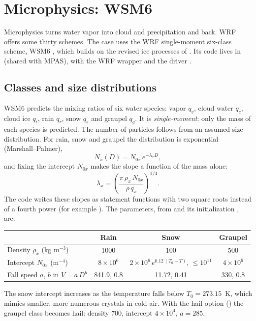 \chapter{Microphysics: WSM6}\label{ch:mp}

Microphysics turns water vapor into cloud and precipitation and back. WRF offers some thirty schemes. The case uses the
WRF single-moment six-class scheme, WSM6 \citep{hong2006wsm6}, which builds on the revised ice processes of
\citet{hong2004}. Its code lives in  (shared
with MPAS), with the WRF wrapper  and the driver .

\section{Classes and size distributions}

WSM6 predicts the mixing ratios of six water species: vapor $q_v$, cloud water $q_c$, cloud ice $q_i$, rain $q_r$,
snow $q_s$ and graupel $q_g$. It is \emph{single-moment}: only the mass of each species is predicted. The number of
particles follows from an assumed size distribution. For rain, snow and graupel the distribution is exponential
(Marshall--Palmer),
\begin{equation}
  N_x(D) = N_{0x}\,e^{-\lambda_x D},
\end{equation}
and fixing the intercept $N_{0x}$ makes the slope a function of the mass alone:
\begin{equation}
  \lambda_x = \left(\frac{\pi\,\rho_x\,N_{0x}}{\rho\,q_x}\right)^{1/4}.
\end{equation}
The code writes these slopes as statement functions with two square roots instead of a fourth power (for example
). The parameters, from  and its initialization
, are:
\begin{center}
\begin{tabular}{lccc}
\toprule
 & Rain & Snow & Graupel \\
\midrule
Density $\rho_x$ (kg m$^{-3}$) & 1000 & 100 & 500 \\
Intercept $N_{0x}$ (m$^{-4}$) & $8\times10^{6}$ & $2\times10^{6}\,e^{0.12\,(T_0 - T)}$, $\le 10^{11}$ & $4\times10^{6}$ \\
Fall speed $a$, $b$ in $V = a\,D^{b}$ & 841.9, 0.8 & 11.72, 0.41 & 330, 0.8 \\
\bottomrule
\end{tabular}
\end{center}
The snow intercept increases as the temperature falls below $T_0 = 273.15$~K, which mimics smaller, more numerous
crystals in cold air. With the hail option () the graupel class becomes hail: density 700, intercept
$4\times10^{4}$, $a = 285$.

